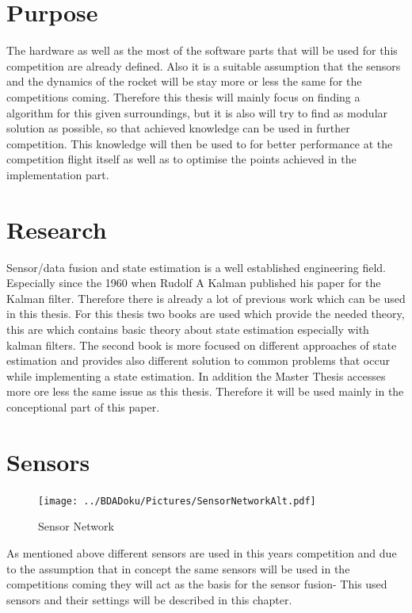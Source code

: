  \section{Purpose}
 The hardware as well as the most of the software parts that will be used for this competition are already defined.
 Also it is a suitable assumption that the sensors and the dynamics of the rocket will be stay more or less the same for the competitions coming.
 Therefore this thesis will mainly focus on finding a algorithm for this given surroundings, but it is also will try to find as modular solution as possible, 
 so that achieved knowledge can be used in further competition. 
 This knowledge will then be used to for better performance at the competition flight itself as well as to optimise the points achieved in the implementation part.
  
 \section{Research}
 Sensor/data fusion and state estimation is a well established engineering field.
 Especially since the 1960 when Rudolf A Kalman published his paper for the Kalman filter.
 Therefore there is already a lot of previous work which can be used in this thesis.
 For this thesis two books are used which provide the needed theory, this are 
 \cite{DavidWSchultz2004} which contains basic theory about state estimation especially with kalman filters. The second book
 \cite{SimonDan2006Ose:} is more focused on different approaches of state estimation and
 provides also different solution to common problems that occur while implementing a state estimation.
 In addition the Master Thesis \cite{BryanTongMinh2012} accesses more ore less the same issue as this thesis.
 Therefore it will be used mainly in the conceptional part of this paper.
 
 \section{Sensors}
 \begin{figure}[h!]
  \centering
  \texttt{[image: ../BDADoku/Pictures/SensorNetworkAlt.pdf]}
  \caption{Sensor Network}
  \label{fig:SensorNetwork}
 \end{figure}

 As mentioned above different sensors are used in this years competition and due to the assumption
 that in concept the same sensors will be used in the competitions coming they will act as the basis for the sensor fusion-
 This used sensors and their settings will be described in this chapter.


